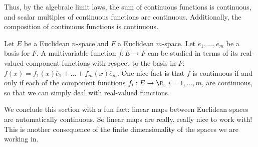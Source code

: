  Thus, by the algebraic limit laws, the sum of continuous functions is continuous, and scalar multiples of continuous functions are continuous. Additionally, the composition of continuous functions is continuous.

 \vspace{3mm}

 Let \( E \) be a Euclidean \( n \)-space and \( F \) a Euclidean \( m \)-space. Let \( \overline{e}_1,\dots,\overline{e}_m \) be a basis for \( F \). A multivariable function \( f:E\to F \) can be studied in terms of its real-valued component functions with respect to the basis in \( F \): \( f(x)=f_1(x)\overline{e}_1+\dots+f_m(x)\overline{e}_m \). One nice fact is that \( f \) is continuous if and only if each of the component functions \( f_i:E\to\R \), \( i=1,\dots, m \), are continuous, so that we can simply deal with real-valued functions.

 \vspace{3mm}

 We conclude this section with a fun fact: linear maps between Euclidean spaces are automatically continuous. So linear maps are really, really nice to work with! This is another consequence of the finite dimensionality of the spaces we are working in.

